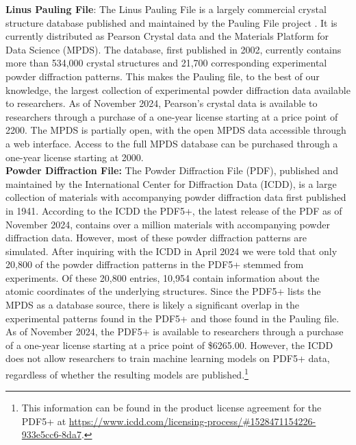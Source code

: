 \textbf{Linus Pauling File}:\cite{PaulingWeb} The Linus Pauling File is a largely commercial crystal structure database published and maintained by the Pauling File project \cite{villars2018}. It is currently distributed as Pearson Crystal data \cite{PearsonWeb} and the Materials Platform for Data Science (MPDS)\cite{MPDSWeb}. The database, first published in 2002, currently contains more than 534,000 crystal structures\cite{MPDSWeb} and 21,700 corresponding experimental powder diffraction patterns\cite{PearsonWeb}. 
This makes the Pauling file, to the best of our knowledge, the largest collection of experimental powder diffraction data available to researchers. As of November 2024, Pearson's crystal data is available to researchers through a purchase of a one-year license starting at a price point of \qty{2200}{\myeuro}. The MPDS is partially open, with the open MPDS data accessible through a web interface\cite{MPDSWeb}. Access to the full MPDS database can be purchased through a one-year license starting at \qty{2000}{\myeuro}. \\

\textbf{Powder Diffraction File:} \cite{PDFWeb} The Powder Diffraction File (PDF), published and maintained by the International Center for Diffraction Data (ICDD), is a large collection of materials with accompanying powder diffraction data first published in 1941\cite{GatesRector2019}. According to the ICDD the PDF5+, the latest release of the PDF as of November 2024, contains over a million materials with accompanying powder diffraction data. However, most of these powder diffraction patterns are simulated. After inquiring with the ICDD in April 2024 we were told that only 20,800 of the powder diffraction patterns in the PDF5+ stemmed from experiments. Of these 20,800 entries, 10,954 contain information about the atomic coordinates of the underlying structures. Since the PDF5+ lists the MPDS as a database source, there is likely a significant overlap in the experimental patterns found in the PDF5+ and those found in the Pauling file. As of November 2024, the PDF5+ is available to researchers through a purchase of a one-year license starting at a price point of \$6265.00. However, the ICDD does not allow researchers to train machine learning models on PDF5+ data, regardless of whether the resulting models are published.\footnote{This information can be found in the product license agreement for the PDF5+ at \url{https://www.icdd.com/licensing-process/\#1528471154226-933e5cc6-8da7}.} \\

